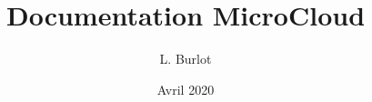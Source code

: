 \documentclass{article}
\title{Documentation MicroCloud}
\author{L. Burlot}
\date{Avril 2020}
\begin{document}
\maketitle
\sloppy
\newpage

\tableofcontents
\newpage
















\end{document}
